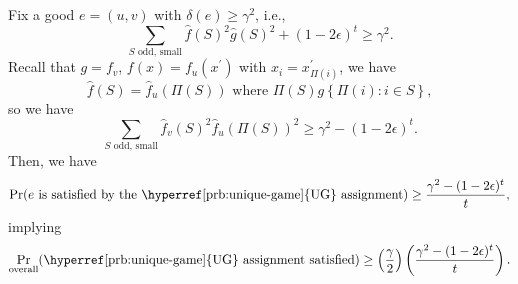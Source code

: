 Fix a good \(e=(u, v)\) with \(\delta (e) \geq \gamma ^{2}\), i.e.,
\[
	\sum_{\text{\(S\) odd, small}} \hat{f} (S)^{2} \hat{g} (S)^{2} + (1-2\epsilon )^t \geq \gamma ^2.
\]
Recall that \(g = f_v\), \(f(x) = f_u(x^\prime )\) with \(x_i = x^\prime _{\Pi (i)}\), we have
\[
	\hat{f} (S) = \hat{f} _u(\Pi (S)) \text{ where } \Pi (S) g \left\{ \Pi (i)\colon i\in S \right\},
\]
so we have
\[
	\sum_{\text{\(S\) odd, small}} \hat{f} _v(S)^{2} \hat{f} _u(\Pi (S))^2 \geq \gamma ^2 - (1-2\epsilon )^t.
\]
Then, we have
\[
	\Pr_{}(e \text{ is satisfied by the \hyperref[prb:unique-game]{UG} assignment} )  \geq \frac{\gamma ^2 - (1 - 2\epsilon )^t}{t},
\]
implying
\[
	\Pr_{\text{overall}}(\text{\hyperref[prb:unique-game]{UG} assignment satisfied}) \geq \left( \frac{\gamma}{2} \right) \left( \frac{\gamma ^{2} - (1 - 2\epsilon )^t}{t} \right).
\]
